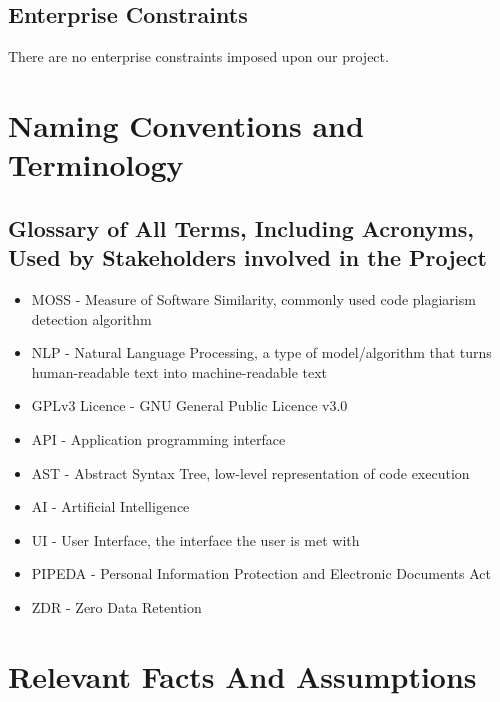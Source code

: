 \documentclass[12pt]{article}
\begin{document}
\subsection{Enterprise Constraints}
There are no enterprise constraints imposed upon our project.

\section{Naming Conventions and Terminology}
\subsection{Glossary of All Terms, Including Acronyms, Used by Stakeholders
involved in the Project}
\begin{itemize}
    \item MOSS - Measure of Software Similarity, commonly used code plagiarism detection algorithm
    \item NLP - Natural Language Processing, a type of model/algorithm that turns human-readable text into machine-readable text
    \item GPLv3 Licence - GNU General Public Licence v3.0
    \item API - Application programming interface
    \item AST - Abstract Syntax Tree, low-level representation of code execution
    \item AI - Artificial Intelligence
    \item UI - User Interface, the interface the user is met with
    \item PIPEDA - Personal Information Protection and Electronic Documents Act
    \item ZDR - Zero Data Retention
\end{itemize}

\section{Relevant Facts And Assumptions}
\end{document}
